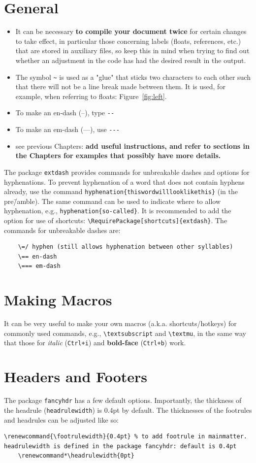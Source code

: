 \documentclass[main_brownies.tex]{subfiles}
\begin{document}
\section{General}
\begin{itemize}
	\item It can be necessary \textbf{to compile your document twice} for certain changes to take effect, in particular those concerning labels (floats, references, etc.) that are stored in auxiliary files, so keep this in mind when trying to find out whether an adjustment in the code has had the desired result in the output.
	\item The symbol \verb*|~| is used as a "glue" that sticks two characters to each other such that there will not be a line break made between them. It is used, for example, when referring to floats: Figure~\ref{fig:left}.
	\item To make an en-dash (--), type \verb*|--|
	\item To make an em-dash (---), use \verb*|---|
	\item see previous Chapters: \textbf{add useful instructions, and refer to sections in the Chapters for examples that possibly have more details.}
\end{itemize}

The package \verb*|extdash| provides commands for unbreakable dashes and options for hyphenations. To prevent hyphenation of a word that does not contain hyphens already, use the command \verb*|hyphenation{thiswordwilllooklikethis}| (in the pre\=/amble). The same command can be used to indicate where to allow hyphenation, e.g., \verb*|hyphenation{so-called}|.
It is recommended to add the option for use of shortcuts: \verb*|\RequirePackage[shortcuts]{extdash}|. The commands for unbreakable dashes are:
\begin{Verbatim}
	\=/ hyphen (still allows hyphenation between other syllables)
	\== en-dash
	\=== em-dash
\end{Verbatim}

\section{Making Macros}
It can be very useful to make your own macros (a.k.a. shortcuts/hotkeys) for commonly used commands, e.g., \verb|\textsubscript| and \verb|\textmu|, in the same way that those for \textit{italic} (\verb|Ctrl+i|) and \textbf{bold-face} (\verb|Ctrl+b|) work.

\section{Headers and Footers}
The package \verb*|fancyhdr| has a few default options. Importantly, the thickness of the headrule (\verb*|headrulewidth|) is 0.4pt by default. The thicknesses of the footrules and headrules can be adjusted like so:
\begin{Verbatim}[breaklines=true]
	\renewcommand{\footrulewidth}{0.4pt} % to add footrule in mainmatter. headrulewidth is defined in the package fancyhdr: default is 0.4pt
	\renewcommand*\headrulewidth{0pt}
\end{Verbatim}
\end{document}
